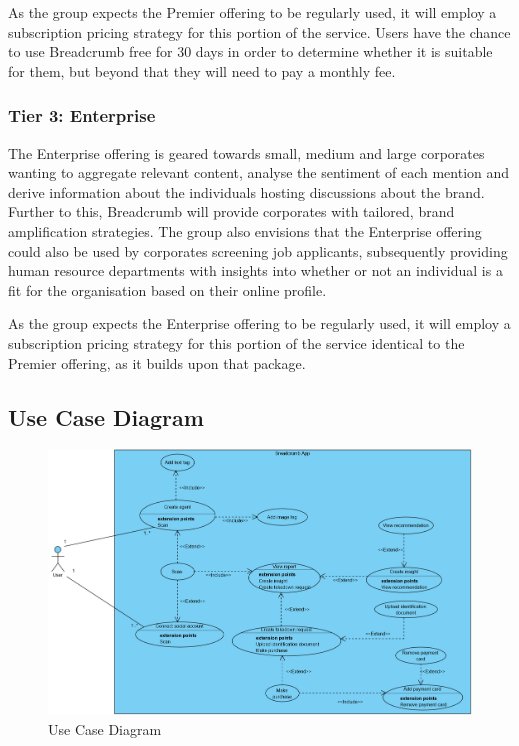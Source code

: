 As the group expects the Premier offering to be regularly used, it will employ a subscription pricing strategy for this portion of the service. Users have the chance to use Breadcrumb free for 30 days in order to determine whether it is suitable for them, but beyond that they will need to pay a monthly fee.

\subsubsection{Tier 3: Enterprise}

The Enterprise offering is geared towards small, medium and large corporates wanting to aggregate relevant content, analyse the sentiment of each mention and derive information about the individuals hosting discussions about the brand. Further to this, Breadcrumb will provide corporates with tailored, brand amplification strategies. The group also envisions that the Enterprise offering could also be used by corporates screening job applicants, subsequently providing human resource departments with insights into whether or not an individual is a fit for the organisation based on their online profile. 

As the group expects the Enterprise offering to be regularly used, it will employ a subscription pricing strategy for this portion of the service identical to the Premier offering, as it builds upon that package.

\subsection{Use Case Diagram}

\begin{figure}
  \centering
  \begin{minipage}{14cm}
    \centering
    \includegraphics[width=14cm]{inc/use_case_diagram.png}
    \caption{Use Case Diagram}
    \label{fig:useCaseDiagram}
  \end{minipage}
\end{figure}

